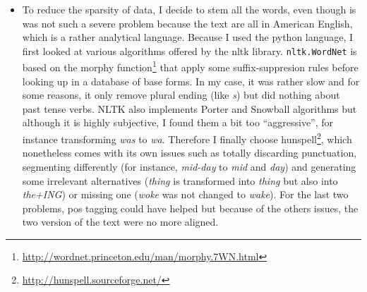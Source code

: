 \begin{itemize}
	 \item To reduce the sparsity of data, I decide to stem all the words, even though is was not such a severe problem because the text are all in American English, which is a rather analytical language. Because I used the python language, I first looked at various algorithms offered by the \gls{nltk} library\autocite{bird2009nltk}. \texttt{nltk.WordNet} is based on the morphy function\footnote{\href{http://wordnet.princeton.edu/man/morphy.7WN.html}{http://wordnet.princeton.edu/man/morphy.7WN.html}} that apply some suffix-suppresion rules before looking up in a database of base forms. In my case, it was rather slow and for some reasons, it only remove plural ending (like \emph{s}) but did nothing about past tense verbs. NLTK also implements Porter\autocite{porter1980algo} and Snowball\autocite{porter2001snowball} algorithms but although it is highly subjective, I found them a bit too \enquote{aggressive}, for instance transforming \emph{was} to \emph{wa}.  Therefore I finally choose hunspell\footnote{\href{http://hunspell.sourceforge.net/}{http://hunspell.sourceforge.net/}}, which nonetheless comes with its own issues such as totally discarding punctuation, segmenting differently (for instance, \emph{mid-day} to \emph{mid} and \emph{day}) and generating some irrelevant alternatives (\emph{thing} is transformed into \emph{thing} but also into \emph{the+ING}) or missing one (\emph{woke} was not changed to \emph{wake}). For the last two problems, \gls{pos} tagging could have helped but because of the others issues, the two version of the text were no more aligned.


\end{itemize}
